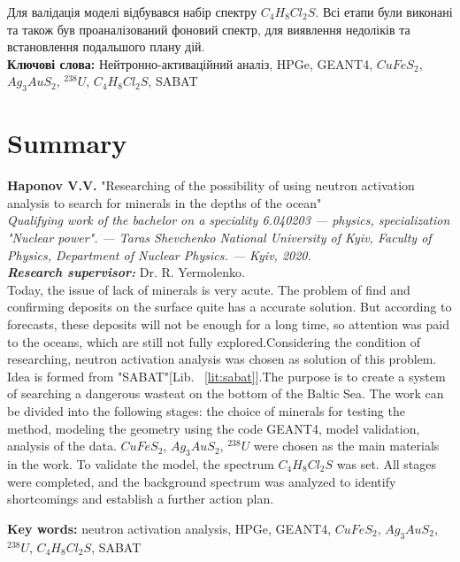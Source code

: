 \documentclass[a4paper, 14pt]{article}
\numberwithin{equation}{section}
\numberwithin{table}{section}
\begin{document}
Для валідація моделі відбувався набір спектру $C_4H_8Cl_2S$.
Всі етапи були виконані та також був проаналізований фоновий спектр, для виявлення недоліків та встановлення подальшого плану дій. \\
{\bf Ключові слова:} Нейтронно-активаційний аналіз, HPGe, GEANT4, $CuFeS_2$, $Ag_3AuS_2$, $^{238}U$, $C_4H_8Cl_2S$, SABAT

\newpage
\thispagestyle{empty}
\section*{Summary}

{\bf Haponov V.V.} "Researching of the possibility of using neutron activation analysis to search for minerals in the depths of the ocean"\\
{\itshape Qualifying work of the bachelor on a speciality 6.040203 --- physics, specialization "Nuclear power". --- Taras Shevchenko National University of Kyiv, Faculty of Physics, Department of Nuclear Physics. --- Kyiv, 2020.\\}
{\itshape \bfseries Research supervisor:} Dr. R. Yermolenko.
\\[0.5cm]
Today, the issue of lack of minerals is very acute. The problem of find and confirming deposits on the surface quite has a accurate solution.
But according to forecasts, these deposits will not be enough for a long time, so
attention was paid to the oceans, which are still not fully explored.Considering the condition of researching, neutron activation analysis was chosen as
solution of this problem. Idea is formed from "SABAT"[Lib. ~\ref{lit:sabat}].The purpose is to create a  system  of searching a dangerous wasteat on
the bottom of the Baltic Sea. The work can be divided into the
following stages: the choice of minerals for testing the method, modeling the
geometry using the code GEANT4, model validation, analysis of the data.
$ CuFeS_2 $, $ Ag_3AuS_2 $, $ ^ {238} U $ were chosen as the main materials in the work.
To validate the model, the spectrum $ C_4H_8Cl_2S $ was set. All stages were
completed, and the background spectrum was analyzed to identify shortcomings and establish a further action plan.

{\bf Key words:} neutron activation analysis, HPGe, GEANT4, $CuFeS_2$, $Ag_3AuS_2$, $^{238}U$, $C_4H_8Cl_2S$, SABAT

\newpage
\tableofcontents
\newpage
\pagestyle{plain}
\setcounter{page}{2}
\newpage
\end{document}
